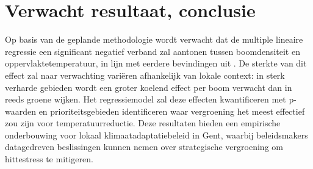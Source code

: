 \section{Verwacht resultaat, conclusie}%
\label{sec:verwachte_resultaten}

Op basis van de geplande methodologie wordt verwacht dat de multiple 
lineaire regressie een significant negatief verband zal aantonen tussen 
boomdensiteit en oppervlaktetemperatuur, in lijn met eerdere bevindingen 
uit \textcite{Knight2021}. De sterkte van dit effect zal naar verwachting 
variëren afhankelijk van lokale context: in sterk verharde gebieden wordt 
een groter koelend effect per boom verwacht dan in reeds groene wijken. 
Het regressiemodel zal deze effecten kwantificeren met p-waarden en 
prioriteitsgebieden identificeren waar vergroening het meest effectief 
zou zijn voor temperatuurreductie. Deze resultaten bieden een empirische 
onderbouwing voor lokaal klimaatadaptatiebeleid in Gent, 
waarbij beleidsmakers datagedreven beslissingen kunnen nemen 
over strategische vergroening om hittestress te mitigeren.
